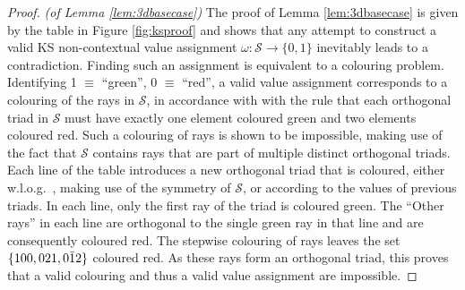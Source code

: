 \begin{proof} \emph{(of Lemma \ref{lem:3dbasecase})}\hfil\break
The proof of Lemma \ref{lem:3dbasecase} is given by the table in Figure \ref{fig:ksproof} and shows that any attempt to construct a valid KS non-contextual value assignment $\omega:\mathbb{\mathcal{S}\rightarrow}\{0,1\}$ inevitably leads to a contradiction. Finding such an assignment is equivalent to a colouring problem. Identifying 1 $\equiv$ ``green'', 0 $\equiv$ ``red'', a valid value assignment corresponds to a colouring of the rays in $\mathcal{S}$, in accordance with with the rule that each orthogonal triad in $\mathcal{S}$ must have exactly one element coloured green and two elements coloured red. Such a colouring of rays is shown to be impossible, making use of the fact that $\mathcal{S}$ contains rays that are part of multiple distinct orthogonal triads. Each line of the table introduces a new orthogonal triad that is coloured, either w.l.o.g.\ , making use of the symmetry of $\mathcal{S}$, or according to the values of previous triads. In each line, only the first ray of the triad is coloured green. The “Other rays” in each line are orthogonal to the single green ray in that line and are consequently coloured red. The stepwise colouring of rays leaves the set $\{100,021,0\text{\ensuremath{\bar{1}}2}\}$ coloured red. As these rays form an orthogonal triad, this proves that a valid colouring and thus a valid value assignment are impossible.
\end{proof}

